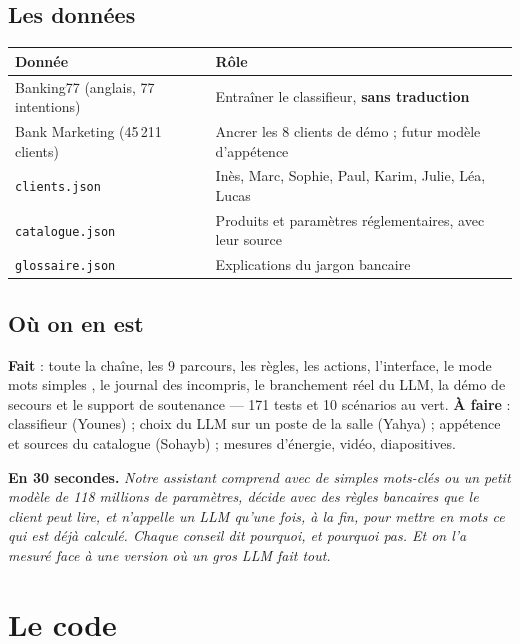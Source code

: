 \documentclass[11pt,a4paper]{article}
\DeclareRobustCommand{\f}[1]{{\texttt{\small\renewcommand{\_}{\char`\_\allowbreak}#1}}}
\begin{document}
\subsection{Les données}

\begin{center}\small
\begin{tabularx}{\textwidth}{@{}L{4.6cm} Y@{}}
\toprule
\textbf{Donnée} & \textbf{Rôle} \\
\midrule
Banking77 (anglais, 77 intentions) & Entraîner le classifieur, \textbf{sans traduction} \\
Bank Marketing (45\,211 clients) & Ancrer les 8 clients de démo ; futur modèle d'appétence \\
\f{clients.json} & Inès, Marc, Sophie, Paul, Karim, Julie, Léa, Lucas \\
\f{catalogue.json} & Produits et paramètres réglementaires, avec leur source \\
\f{glossaire.json} & Explications du jargon bancaire \\
\bottomrule
\end{tabularx}
\end{center}

\subsection{Où on en est}

\textbf{Fait} : toute la chaîne, les 9 parcours, les règles, les actions, l'interface, le mode
\og mots simples \fg, le journal des incompris, le branchement réel du LLM, la démo de secours et
le support de soutenance --- 171 tests et 10 scénarios au vert.
\textbf{À faire} : classifieur (Younes) ; choix du LLM sur un poste de la salle (Yahya) ;
appétence et sources du catalogue (Sohayb) ; mesures d'énergie, vidéo, diapositives.

\begin{cle}
\textbf{En 30 secondes.} \emph{Notre assistant comprend avec de simples mots-clés ou un petit
modèle de 118 millions de paramètres, décide avec des règles bancaires que le client peut lire,
et n'appelle un LLM qu'une fois, à la fin, pour mettre en mots ce qui est déjà calculé. Chaque
conseil dit pourquoi, et pourquoi pas. Et on l'a mesuré face à une version où un gros LLM fait
tout.}
\end{cle}

\section{Le code}
\end{document}
